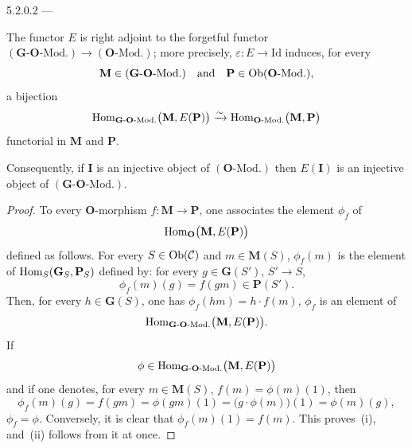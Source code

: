 \begin{lemma}{5.2.0.2}\label{I.5.2.0.2}
--- {\renewcommand{\thefootnote}{(48)}\footnotemark[\value{footnote}]}
\par
\begin{enumeratei}
\item The functor \(E\) is right adjoint to the forgetful functor
\((\mathbf{G}\text{-}\mathbf{O}\text{-}\mathrm{Mod.}) \to
(\mathbf{O}\text{-}\mathrm{Mod.})\); more precisely,
\(\varepsilon \colon E \to \mathrm{Id}\) induces, for every
\[
\mathbf{M} \in (\mathbf{G}\text{-}\mathbf{O}\text{-}\mathrm{Mod.})
\quad\text{and}\quad
\mathbf{P} \in \operatorname{Ob}(\mathbf{O}\text{-}\mathrm{Mod.}),
\]
a bijection
\[
\operatorname{Hom}_{\mathbf{G}\text{-}\mathbf{O}\text{-}\mathrm{Mod.}}
\bigl(\mathbf{M}, E(\mathbf{P})\bigr)
\xrightarrow{\sim}
\operatorname{Hom}_{\mathbf{O}\text{-}\mathrm{Mod.}}\bigl(\mathbf{M}, \mathbf{P}\bigr)
\]
functorial in \(\mathbf{M}\) and \(\mathbf{P}\).
\item Consequently, if \(\mathbf{I}\) is an injective object of
\((\mathbf{O}\text{-}\mathrm{Mod.})\) then \(E(\mathbf{I})\) is an injective
object of \((\mathbf{G}\text{-}\mathbf{O}\text{-}\mathrm{Mod.})\).
\end{enumeratei}
\end{lemma}

\begin{proof}
To every \(\mathbf{O}\)-morphism \(f \colon \mathbf{M} \to \mathbf{P}\), one
associates the element \(\phi_{f}\) of
\[
\operatorname{Hom}_{\mathbf{O}}\bigl(\mathbf{M}, E(\mathbf{P})\bigr)
\]
defined as follows.
For every \(S \in \operatorname{Ob}(\mathcal{C})\) and \(m \in \mathbf{M}(S)\),
\(\phi_{f}(m)\) is the element of
\(\operatorname{Hom}_{S}(\mathbf{G}_{S}, \mathbf{P}_{S})\) defined by: for every
\(g \in \mathbf{G}(S')\), \(S' \to S\),
\[
\phi_{f}(m)(g) = f(gm) \in \mathbf{P}(S').
\]
Then, for every \(h \in \mathbf{G}(S)\), one has
\(\phi_{f}(hm) = h \cdot f(m)\),
\ie \(\phi_{f}\) is an element of
\[
\operatorname{Hom}_{\mathbf{G}\text{-}\mathbf{O}\text{-}\mathrm{Mod.}}
\bigl(\mathbf{M}, E(\mathbf{P})\bigr).
\]
If
\[
\phi \in \operatorname{Hom}_{\mathbf{G}\text{-}\mathbf{O}\text{-}\mathrm{Mod.}}
\bigl(\mathbf{M}, E(\mathbf{P})\bigr)
\]
and if one denotes, for every
\(m \in \mathbf{M}(S)\), \(f(m) = \phi(m)(1)\), then
\[
\phi_{f}(m)(g) = f(gm) = \phi(gm)(1)
= \bigl(g \cdot \phi(m)\bigr)(1) = \phi(m)(g),
\]
\ie \(\phi_{f} = \phi\). Conversely, it is clear that
\(\phi_{f}(m)(1) = f(m)\). This proves~(i), and~(ii) follows from it at once.
\end{proof}

